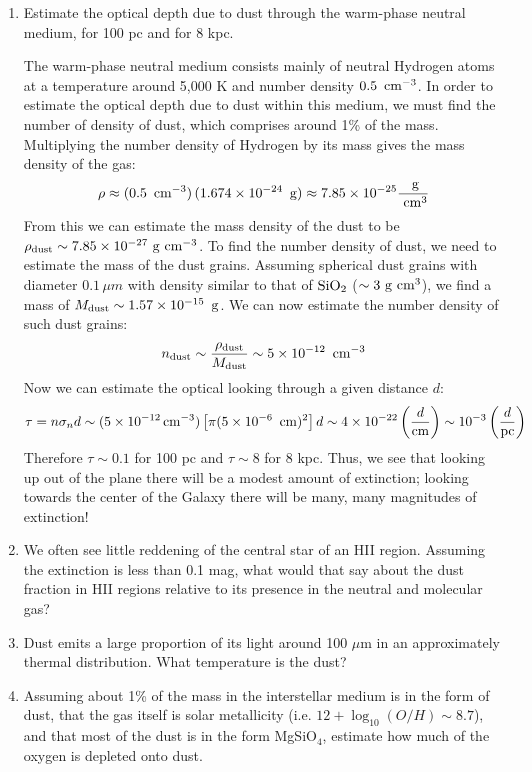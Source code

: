 \begin{enumerate}
\item Estimate the optical depth due to dust through the warm-phase neutral
medium, for 100 pc and for 8 kpc.
\begin{answer}
The warm-phase neutral medium consists mainly of neutral Hydrogen
atoms at a temperature around 5,000 K and number density $0.5 \, {\rm
~cm}^{-3}$. In order to estimate the optical depth due to dust within
this medium, we must find the number of density of dust, which
comprises around 1\% of the mass. Multiplying the number density of
Hydrogen by its mass gives the mass density of the gas:
\begin{equation}
\rho \approx (0.5 \, {\rm ~cm}^{-3}) \, (1.674\times10^{-24} \, {\rm
~g}) \approx 7.85\times10^{-25} \frac{{\rm ~g}}{{\rm ~cm}^3}
\end{equation}
From this we can estimate the mass density of the dust to be
$\rho_{\rm dust} \sim 7.85\times 10^{-27} {\rm ~g}{\rm ~cm}^{-3}$. To
find the number density of dust, we need to estimate the mass of the
dust grains. Assuming spherical dust grains with diameter $0.1 \, \mu
m$ with density similar to that of ${\rm SiO}_2$ ($\sim 3 {\rm ~g}{\rm
~cm}^3$), we find a mass of $M_{\rm dust} \sim 1.57\times10^{-15} \,
{\rm ~g}$. We can now estimate the number density of such dust grains:
\begin{equation}
n_{\rm dust} \sim \frac{\rho_{\rm dust}}{M_{\rm dust}} \sim 5\times
10^{-12} \, {\rm ~cm}^{-3}
\end{equation}
Now we can estimate the optical looking through a given
distance $d$:
\begin{equation}
\tau = n \sigma_n d \sim (5 \times 10^{-12} \, {\rm cm}^{-3})
\left[\pi (5\times10^{-6} \, {\rm ~cm})^2\right] d \sim
4\times 10^{-22} \left(\frac{d}{\rm cm}\right) \sim
10^{-3} \left(\frac{d}{\rm pc}\right)
\end{equation}
Therefore $\tau \sim 0.1$ for 100 pc and $\tau\sim 8$ 
for 8 kpc. Thus, we see that looking up out of the plane there will be
a modest amount of extinction; looking towards the center of the
Galaxy there will be many, many magnitudes of extinction!
\end{answer}
\item We often see little reddening of the central star of an HII
region. Assuming the extinction is less than 0.1 mag, what would that
say about the dust fraction in HII regions relative to its presence in
the neutral and molecular gas?
\item Dust emits a large proportion of its light around 100 $\mu$m in
an approximately thermal distribution. What temperature is the dust?
\item Assuming about 1\% of the mass in the interstellar medium is in
the form of dust, that the gas itself is solar metallicity (i.e. $12
+ \log_{10}(O/H) \sim 8.7$), and that most of the dust is in the form
MgSiO$_4$, estimate how much of the oxygen is depleted onto dust.


\end{enumerate}
